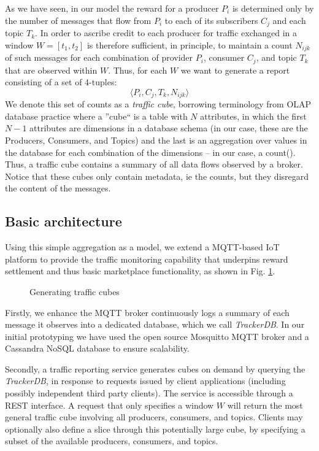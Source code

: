 \documentclass[conference]{IEEEtran}
\begin{document}
As we have seen, in our model the reward for a producer $ P_i $ is determined only by the number of messages that flow from $ P_i $ to each of its subscribers $ C_j $ and each topic $ T_k $.
In order to ascribe credit to each producer for traffic exchanged in a window $ W = [t_1, t_2] $ is therefore sufficient, in principle, to maintain a count $ N_{ijk} $ of such messages for each combination of provider $ P_i $, consumer $ C_j $, and topic $ T_k $ that are observed within $ W $.
Thus, for each $ W $ we want to generate a report consisting of a set of 4-tuples:
\[  \langle P_i, C_j, T_k, N_{ijk} \rangle  \]
We denote this set of counts as a \textit{traffic cube}, borrowing terminology from OLAP database practice where a ''cube`` is a table with $ N $ attributes, in which the first $ N-1 $ attributes are  dimensions in a database schema (in our case, these are the Producers, Consumers, and Topics) and the last is an aggregation over values in the database for each combination of the dimensions -- in our case, a count().
Thus, a traffic cube contains a summary  of all data flows observed by a broker. Notice that these cubes only contain metadata, ie the counts, but they disregard the content of the messages.

\subsection{Basic architecture}

Using this simple aggregation as a model, we extend a  MQTT-based IoT platform to provide the traffic monitoring capability that underpins reward settlement and thus basic marketplace functionality, as shown in Fig. \ref{fig:cubes}.

\begin{figure}
	\caption{Generating traffic cubes}
	\label{fig:cubes}
\end{figure}

Firstly, we enhance the MQTT broker continuously logs a summary of each message it observes into a dedicated database, which we call \textit{TrackerDB}.  In our initial prototyping we have used the open source Mosquitto MQTT broker and a Cassandra NoSQL database to ensure scalability. 

Secondly, a traffic reporting service generates cubes on demand by querying the \textit{TrackerDB}, in response to requests issued by client applications (including possibly independent third party clients). The service is accessible through a REST interface. A request that only specifies a window $ W $ will return the most general traffic cube involving all producers, consumers, and topics. Clients may optionally also define a slice through this potentially large cube, by specifying a subset of the available producers, consumers, and topics.
\end{document}
